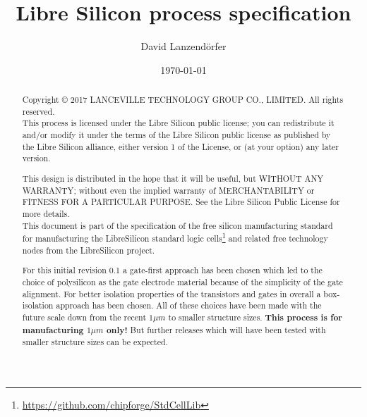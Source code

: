 \documentclass[10pt,a4paper,oneside]{article}
\title{Libre Silicon process specification}
\date{\today}
\author{David Lanzendörfer}
\newcounter{ct}
\begin{document}
\maketitle
\begin{abstract}
	Copyright © 2017 LANCEVILLE TECHNOLOGY GROUP CO., LIMITED. All rights reserved. \\

	This process is licensed under the Libre Silicon public license; you can redistribute it and/or modify it under the terms of the Libre Silicon public license
	as published by the Libre Silicon alliance, either version 1 of the License, or (at your option) any later version.

	This design is distributed in the hope that it will be useful, but WITHOUT ANY WARRANTY; without even the implied warranty of MERCHANTABILITY or FITNESS FOR A PARTICULAR PURPOSE.
	See the Libre Silicon Public License for more details. \\

	This document is part of the specification of the free silicon manufacturing standard for manufacturing the LibreSilicon standard logic cells\footnote{\url{https://github.com/chipforge/StdCellLib}} and related free technology nodes from the LibreSilicon project.

	For this initial revision 0.1 a gate-first approach has been chosen which led to the choice of polysilicon as the gate electrode material because of the simplicity of the gate alignment.
	For better isolation properties of the transistors and gates in overall a box-isolation approach has been chosen.
	All of these choices have been made with the future scale down from the recent $1 \mu m$ to smaller structure sizes.
	\textbf{This process is for manufacturing $1 \mu m$ only!}
	But further releases which will have been tested with smaller structure sizes can be expected.
\end{abstract}
\newpage


\newpage




\newpage

\newpage

\newpage

\newpage

\newpage

\newpage

\end{document}
